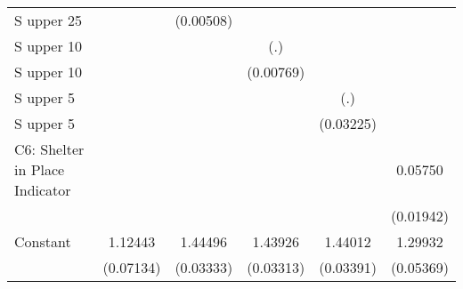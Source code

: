 \begin{table}[htbp]
\begin{tabular}{l*{5}{c}}
\addlinespace
S upper 25%
                    &                     &   (0.00508)         &                     &                     &                     \\
\addlinespace
S upper 10%
                    &                     &                     &         (.)         &                     &                     \\
\addlinespace
S upper 10%
                    &                     &                     &   (0.00769)         &                     &                     \\
\addlinespace
S upper 5%
                    &                     &                     &                     &         (.)         &                     \\
\addlinespace
S upper 5%
                    &                     &                     &                     &   (0.03225)         &                     \\
\addlinespace
C6: Shelter in Place Indicator&                     &                     &                     &                     &     0.05750\sym{***}\\
                    &                     &                     &                     &                     &   (0.01942)         \\
\addlinespace
Constant            &     1.12443\sym{***}&     1.44496\sym{***}&     1.43926\sym{***}&     1.44012\sym{***}&     1.29932\sym{***}\\
                    &   (0.07134)         &   (0.03333)         &   (0.03313)         &   (0.03391)         &   (0.05369)         \\

\end{tabular}
\end{table}
